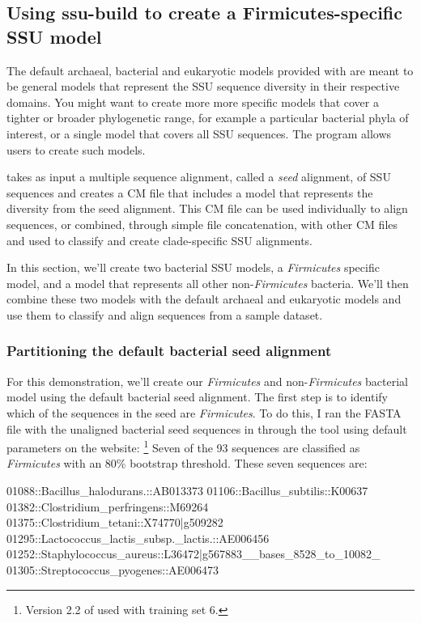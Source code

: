 \subsection{Using ssu-build to create a Firmicutes-specific SSU model}
\label{sec:tutorial-build-firmicutes}

The default archaeal, bacterial and eukaryotic models provided with
 are meant to be general models that represent the SSU
sequence diversity in their respective domains. You might want to
create more more specific models that cover a tighter or broader
phylogenetic range, for example a particular bacterial phyla of
interest, or a single model that covers all SSU sequences. The
 program allows users to create such models. 

 takes as input a multiple sequence alignment, called
a \emph{seed} alignment, of SSU sequences and creates a CM file that
includes a model that represents the diversity from the seed
alignment. This CM file can be used individually to align sequences,
or combined, through simple file concatenation, with other CM files
and used to classify and create clade-specific SSU alignments.

In this section, we'll create two bacterial SSU models, a
\emph{Firmicutes} specific model, and a model that represents all
other non-\emph{Firmicutes} bacteria. We'll then combine these two
models with the default archaeal and eukaryotic models and use them to
classify and align sequences from a sample dataset. 

\subsubsection{Partitioning the default bacterial seed alignment}

For this demonstration, we'll create our \emph{Firmicutes} and
non-\emph{Firmicutes} bacterial model using the default bacterial seed
alignment. The first step is to identify which of the sequences in the
seed are \emph{Firmicutes}. To do this, I ran the FASTA file with the
unaligned bacterial seed sequences in 
through the  tool using default parameters
\cite{Wang07}
on the  website:
\footnote{Version
  2.2 of  used with  training set 6.}
Seven of the 93 sequences are classified as \emph{Firmicutes} with an
80\% bootstrap threshold. These seven sequences are:
\begin{sreoutput}
01088::Bacillus_halodurans.::AB013373
01106::Bacillus_subtilis::K00637
01382::Clostridium_perfringens::M69264
01375::Clostridium_tetani::X74770|g509282
01295::Lactococcus_lactis_subsp._lactis.::AE006456
01252::Staphylococcus_aureus::L36472|g567883__bases_8528_to_10082_
01305::Streptococcus_pyogenes::AE006473
\end{sreoutput}

